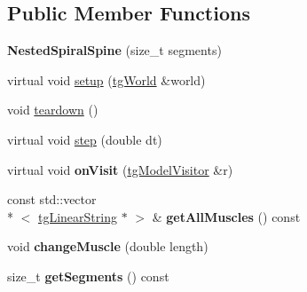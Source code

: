 \subsection*{Public Member Functions}
\begin{DoxyCompactItemize}
\item 
\hypertarget{class_nested_spiral_spine_aa62eb5655553a92a5442848297422570}{{\bfseries Nested\-Spiral\-Spine} (size\-\_\-t segments)}\label{class_nested_spiral_spine_aa62eb5655553a92a5442848297422570}

\item 
virtual void \hyperlink{class_nested_spiral_spine_a87ca6b8b6482b448be5826e7fef49287}{setup} (\hyperlink{classtg_world}{tg\-World} \&world)
\item 
void \hyperlink{class_nested_spiral_spine_aea6ab5feee049adfb73835c848366392}{teardown} ()
\item 
virtual void \hyperlink{class_nested_spiral_spine_adcf53d51b436c471765513c9ab203be7}{step} (double dt)
\item 
\hypertarget{class_nested_spiral_spine_a7a84a4fe6cdbcda667b56fce59f3bf42}{virtual void {\bfseries on\-Visit} (\hyperlink{classtg_model_visitor}{tg\-Model\-Visitor} \&r)}\label{class_nested_spiral_spine_a7a84a4fe6cdbcda667b56fce59f3bf42}

\item 
\hypertarget{class_nested_spiral_spine_ad7086d8c999cf7657c99c6aa5a7eb236}{const std\-::vector\\*
$<$ \hyperlink{classtg_linear_string}{tg\-Linear\-String} $\ast$ $>$ \& {\bfseries get\-All\-Muscles} () const }\label{class_nested_spiral_spine_ad7086d8c999cf7657c99c6aa5a7eb236}

\item 
\hypertarget{class_nested_spiral_spine_a5704f8adbc42081af215a4fde92afaa4}{void {\bfseries change\-Muscle} (double length)}\label{class_nested_spiral_spine_a5704f8adbc42081af215a4fde92afaa4}

\item 
\hypertarget{class_nested_spiral_spine_aa74b2fb09171a4417531ee3dd5ed5d53}{size\-\_\-t {\bfseries get\-Segments} () const }\label{class_nested_spiral_spine_aa74b2fb09171a4417531ee3dd5ed5d53}


\end{DoxyCompactItemize}
